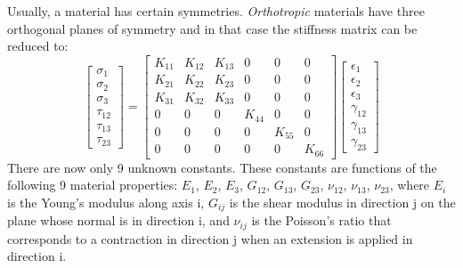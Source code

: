 \documentclass{article}
\begin{document}
Usually, a material has certain symmetries.  \emph{Orthotropic} materials have three orthogonal planes of symmetry and in that case the stiffness matrix can be reduced to:
\begin{equation}
\left[
\begin{matrix}
\sigma_{1}\\
\sigma_{2}\\
\sigma_{3}\\
\tau_{12}\\
\tau_{13}\\
\tau_{23}
\end{matrix}
\right]
=
\left[
\begin{matrix}
K_{11} & K_{12} & K_{13} & 0 & 0 & 0 \\
K_{21} & K_{22} & K_{23} & 0 & 0 & 0 \\
K_{31} & K_{32} & K_{33} & 0 & 0 & 0 \\
0 & 0 & 0 & K_{44} & 0 & 0 \\
0 & 0 & 0 & 0 & K_{55} & 0 \\
0 & 0 & 0 & 0 & 0 & K_{66}
\end{matrix}
\right]
\left[
\begin{matrix}
\epsilon_{1}\\
\epsilon_{2}\\
\epsilon_{3}\\
\gamma_{12}\\
\gamma_{13}\\
\gamma_{23}
\end{matrix}
\right]
\label{eq:orthoconstit}
\end{equation}
There are now only 9 unknown constants.  These constants are functions of the following 9 material properties: $E_{1}$, $E_{2}$, $E_{3}$, $G_{12}$, $G_{13}$, $G_{23}$, $\nu_{12}$, $\nu_{13}$, $\nu_{23}$, where ${E}_{i}$ is the Young's modulus along axis i, $G_{ij}$ is the shear modulus in direction j on the plane whose normal is in direction i, and $\nu_{ij}$ is the Poisson's ratio that corresponds to a contraction in direction j when an extension is applied in direction i.
\end{document}

